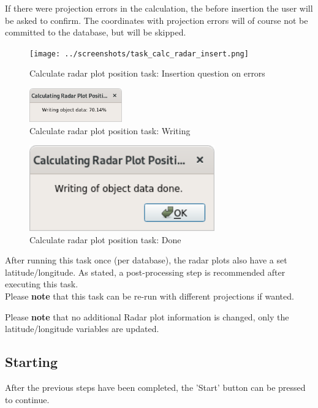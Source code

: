 {If there were projection errors in the calculation, the before insertion the user will be asked to confirm. The coordinates with projection errors will of course not be committed to the database, but will be skipped.

\begin{figure}[H]
  \center
    \texttt{[image: ../screenshots/task\_calc\_radar\_insert.png]}
  \caption{Calculate radar plot position task: Insertion question on errors}
\end{figure}


\begin{figure}[H]
  \center
    \includegraphics[width=4cm,frame]{../screenshots/task_calc_radar_write.png}
  \caption{Calculate radar plot position task: Writing}
\end{figure}

\begin{figure}[H]
  \center
    \includegraphics[width=8cm,frame]{../screenshots/task_calc_radar_done.png}
  \caption{Calculate radar plot position task: Done}
\end{figure}

After running this task once (per database), the radar plots also have a set latitude/longitude. As stated, a post-processing step is recommended after executing this task. \\

Please \textbf{note} that this task can be re-run with different projections if wanted.

Please \textbf{note} that no additional Radar plot information is changed, only the latitude/longitude variables are updated.
 

\subsection{Starting}

After the previous steps have been completed, the 'Start' button can be pressed to continue. \\

}
